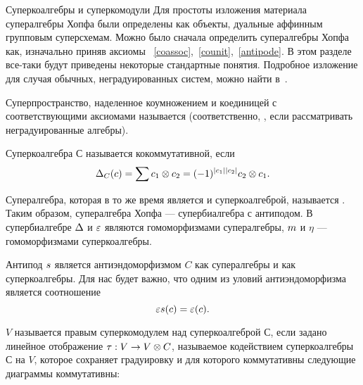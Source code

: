 \begin{subsection}{Суперкоалгебры и суперкомодули}
  Для простоты изложения материала супералгебры Хопфа были определены как
  объекты, дуальные аффинным групповым суперсхемам. Можно было сначала
  определить супералгебры Хопфа как, изначально приняв аксиомы
  ~\ref{coassoc},~\ref{counit},~\ref{antipode}. В этом разделе все-таки будут
  приведены некоторые стандартные понятия. Подробное изложение для случая
  обычных, неградуированных систем, можно найти в~\cite{sweedler}.

  Суперпространство, наделенное коумножением и коединицей с соответствующими
  аксиомами называется  (соответственно, ,
  если рассматривать неградуированные алгебры).
  \begin{definition}
    Суперкоалгебра $ С $ называется кокоммутативной, если
    $$ \mcm_C (c) = \sum c_1 \o c_2 = \sgn{c_1}{c_2} c_2 \o c_1. $$
  \end{definition}

  Супералгебра, которая в то же время
  является и суперкоалгеброй, называется . Таким образом,
  супералгебра Хопфа --- супербиалгебра с антиподом. В супербиалгебре
  $ \Delta $ и $ \varepsilon $ являются гомоморфизмами супералгебры, $ m $ и $ \eta $ ---
  гомоморфизмами суперкоалгебры.

  Антипод $ s $ является антиэндоморфизмом $ C $ как супералгебры и как
  суперкоалгебры. Для нас будет важно, что одним из уловий антиэндоморфизма
  является соотношение
  \begin{equation}\label{antiendomorphism}
    \varepsilon s(c) = \varepsilon(c).
  \end{equation}

  \begin{definition}
    $ V $ называется правым суперкомодулем над суперкоалгеброй $ С $, если задано
    линейное отображение $ \tau: V \to V \otimes C $, называемое кодействием
    суперкоалгебры $ С $ на $ V $, которое сохраняет градуировку и
    для которого коммутативны следующие диаграммы коммутативны:


\end{definition}
\end{subsection}
